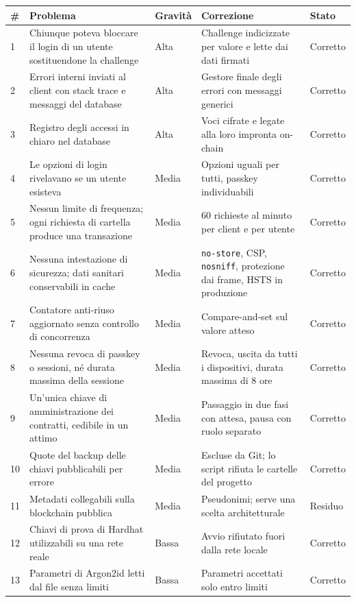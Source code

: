 \begin{table}[H]
\centering\footnotesize
\renewcommand{\arraystretch}{1.2}
\begin{tabular}{@{}p{}p{}p{}p{}p{}@{}}
\toprule
\# & Problema & Gravità & Correzione & Stato\\
\midrule
1 & Chiunque poteva bloccare il login di un utente sostituendone la challenge & Alta & Challenge indicizzate per valore e lette dai dati firmati & Corretto\\
2 & Errori interni inviati al client con stack trace e messaggi del database & Alta & Gestore finale degli errori con messaggi generici & Corretto\\
3 & Registro degli accessi in chiaro nel database & Alta & Voci cifrate e legate alla loro impronta on-chain & Corretto\\
4 & Le opzioni di login rivelavano se un utente esisteva & Media & Opzioni uguali per tutti, passkey individuabili & Corretto\\
5 & Nessun limite di frequenza; ogni richiesta di cartella produce una transazione & Media & 60 richieste al minuto per client e per utente & Corretto\\
6 & Nessuna intestazione di sicurezza; dati sanitari conservabili in cache & Media & \texttt{no-store}, CSP, \texttt{nosniff}, protezione dai frame, HSTS in produzione & Corretto\\
7 & Contatore anti-riuso aggiornato senza controllo di concorrenza & Media & Compare-and-set sul valore atteso & Corretto\\
8 & Nessuna revoca di passkey o sessioni, né durata massima della sessione & Media & Revoca, uscita da tutti i dispositivi, durata massima di 8 ore & Corretto\\
9 & Un'unica chiave di amministrazione dei contratti, cedibile in un attimo & Media & Passaggio in due fasi con attesa, pausa con ruolo separato & Corretto\\
10 & Quote del backup delle chiavi pubblicabili per errore & Media & Escluse da Git; lo script rifiuta le cartelle del progetto & Corretto\\
11 & Metadati collegabili sulla blockchain pubblica & Media & Pseudonimi; serve una scelta architetturale & Residuo\\
12 & Chiavi di prova di Hardhat utilizzabili su una rete reale & Bassa & Avvio rifiutato fuori dalla rete locale & Corretto\\
13 & Parametri di Argon2id letti dal file senza limiti & Bassa & Parametri accettati solo entro limiti & Corretto\\

\end{tabular}
\end{table}
